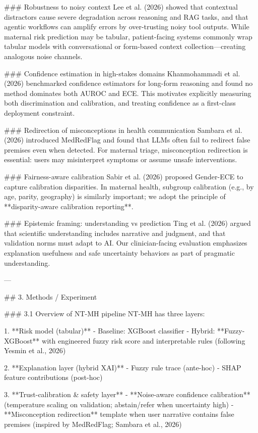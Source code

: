 ### Robustness to noisy context  
Lee et al. (2026) showed that contextual distractors cause severe degradation across reasoning and RAG tasks, and that agentic workflows can amplify errors by over-trusting noisy tool outputs. While maternal risk prediction may be tabular, patient-facing systems commonly wrap tabular models with conversational or form-based context collection—creating analogous noise channels.

### Confidence estimation in high-stakes domains  
Khanmohammadi et al. (2026) benchmarked confidence estimators for long-form reasoning and found no method dominates both AUROC and ECE. This motivates explicitly measuring both discrimination and calibration, and treating confidence as a first-class deployment constraint.

### Redirection of misconceptions in health communication  
Sambara et al. (2026) introduced MedRedFlag and found that LLMs often fail to redirect false premises even when detected. For maternal triage, misconception redirection is essential: users may misinterpret symptoms or assume unsafe interventions.

### Fairness-aware calibration  
Sabir et al. (2026) proposed Gender-ECE to capture calibration disparities. In maternal health, subgroup calibration (e.g., by age, parity, geography) is similarly important; we adopt the principle of **disparity-aware calibration reporting**.

### Epistemic framing: understanding vs prediction  
Ting et al. (2026) argued that scientific understanding includes narrative and judgment, and that validation norms must adapt to AI. Our clinician-facing evaluation emphasizes explanation usefulness and safe uncertainty behaviors as part of pragmatic understanding.

---

## 3. Methods / Experiment  

### 3.1 Overview of NT-MH pipeline  
NT-MH has three layers:

1. **Risk model (tabular)**  
   - Baseline: XGBoost classifier  
   - Hybrid: **Fuzzy-XGBoost** with engineered fuzzy risk score and interpretable rules (following Yesmin et al., 2026)

2. **Explanation layer (hybrid XAI)**  
   - Fuzzy rule trace (ante-hoc)  
   - SHAP feature contributions (post-hoc)

3. **Trust-calibration & safety layer**  
   - **Noise-aware confidence calibration** (temperature scaling on validation; abstain/refer when uncertainty high)  
   - **Misconception redirection** template when user narrative contains false premises (inspired by MedRedFlag; Sambara et al., 2026)

